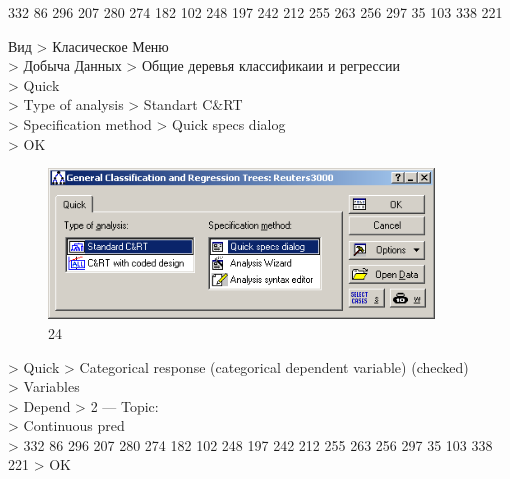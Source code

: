332 86 296 207 280 274 182 102 248 197 242 212 255 263 256 297 35 103 338 221

\newpage

Вид > Класическое Меню \\
> Добыча Данных > Общие деревья классификаии и регрессии \\
> Quick \\
> Type of analysis > Standart C\&RT \\
> Specification method > Quick specs dialog \\
> OK \\

\begin{figure}[!h]
  \centering

  \includegraphics[height=4cm]
  {inc/24.PNG}

  \caption{24}

  \label{fig:24}
\end{figure}

> Quick > Categorical response (categorical dependent variable) (checked) \\
> Variables \\
> Depend > 2 — Topic: \\
> Continuous pred\\
> 332 86 296 207 280 274 182 102 248 197 242 212 255 263 256 297 35 103 338 221 > OK\\

